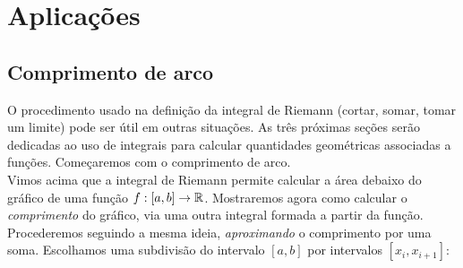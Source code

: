 

\chapter{Aplicações}\label{CAP:Applicacoes}

\ifdefined\updateans
\fi

\section{Comprimento de arco}
O procedimento usado na definição da integral de Riemann (cortar, somar, tomar
um limite) pode ser útil em outras situações.
As três próximas seções serão dedicadas ao uso de integrais para
calcular  quantidades geométricas associadas a funções.
Começaremos com o comprimento de arco.\\

Vimos acima que a integral de Riemann permite calcular a área debaixo 
do gráfico de uma função $f:[a,b]\to \mathbb{R}$. 
Mostraremos agora como calcular o \emph{comprimento} 
do gráfico, via uma outra integral formada a partir da função.\\

Procederemos seguindo a mesma ideia, \emph{aproximando} o comprimento 
por uma soma. Escolhamos uma subdivisão do intervalo $[a,b]$ por intervalos $[x_i,x_{i+1}]$:

\begin{center}
\begin{bmlimage}\end{bmlimage}
\end{center}

